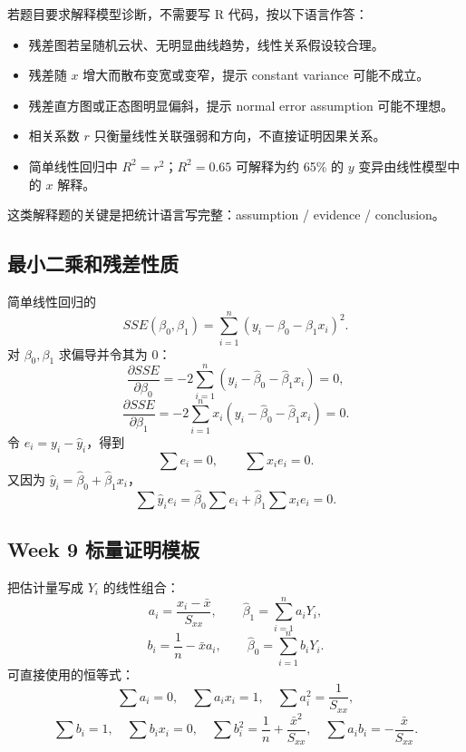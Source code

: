 \documentclass[11pt,a4paper]{article}
\begin{document}
\begin{methodbox}
若题目要求解释模型诊断，不需要写 R 代码，按以下语言作答：
\begin{itemize}
  \item 残差图若呈随机云状、无明显曲线趋势，线性关系假设较合理。
  \item 残差随 $x$ 增大而散布变宽或变窄，提示 constant variance 可能不成立。
  \item 残差直方图或正态图明显偏斜，提示 normal error assumption 可能不理想。
  \item 相关系数 $r$ 只衡量线性关联强弱和方向，不直接证明因果关系。
  \item 简单线性回归中 $R^2=r^2$；$R^2=0.65$ 可解释为约 65\% 的 $y$ 变异由线性模型中的 $x$ 解释。
\end{itemize}
这类解释题的关键是把统计语言写完整：assumption / evidence / conclusion。
\end{methodbox}

\subsection{最小二乘和残差性质}

\begin{proofbox}
简单线性回归的
\[
  SSE(\beta_0,\beta_1)
  =
  \sum_{i=1}^n(y_i-\beta_0-\beta_1x_i)^2.
\]
对 $\beta_0,\beta_1$ 求偏导并令其为 0：
\[
  \frac{\partial SSE}{\partial \beta_0}
  =
  -2\sum_{i=1}^n(y_i-\hat\beta_0-\hat\beta_1x_i)=0,
\]
\[
  \frac{\partial SSE}{\partial \beta_1}
  =
  -2\sum_{i=1}^nx_i(y_i-\hat\beta_0-\hat\beta_1x_i)=0.
\]
令 $e_i=y_i-\hat y_i$，得到
\[
  \boxed{\sum e_i=0},
  \qquad
  \boxed{\sum x_ie_i=0}.
\]
又因为 $\hat y_i=\hat\beta_0+\hat\beta_1x_i$，
\[
  \sum \hat y_ie_i
  =
  \hat\beta_0\sum e_i+\hat\beta_1\sum x_ie_i=0.
\]
\end{proofbox}

\subsection{Week 9 标量证明模板}

\begin{memorybox}[老师备课图的核心入口]
把估计量写成 $Y_i$ 的线性组合：
\[
  a_i=\frac{x_i-\bar x}{S_{xx}},
  \qquad
  \hat\beta_1=\sum_{i=1}^na_iY_i,
\]
\[
  b_i=\frac1n-\bar x a_i,
  \qquad
  \hat\beta_0=\sum_{i=1}^nb_iY_i.
\]
可直接使用的恒等式：
\[
  \sum a_i=0,\quad
  \sum a_ix_i=1,\quad
  \sum a_i^2=\frac1{S_{xx}},
\]
\[
  \sum b_i=1,\quad
  \sum b_ix_i=0,\quad
  \sum b_i^2=\frac1n+\frac{\bar x^2}{S_{xx}},\quad
  \sum a_ib_i=-\frac{\bar x}{S_{xx}}.
\]
\end{memorybox}
\end{document}
